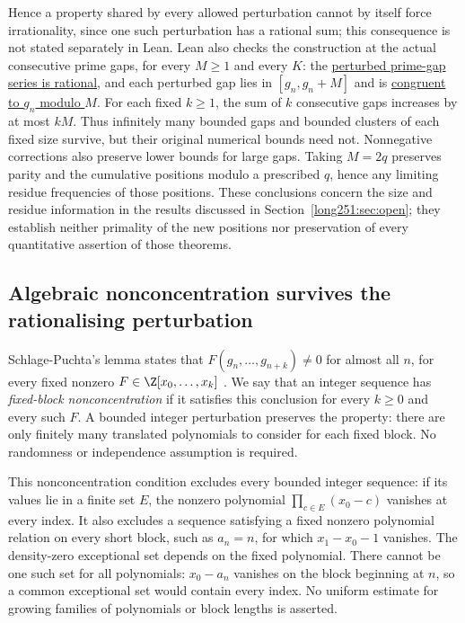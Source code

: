 \noindent Hence a property shared by every allowed perturbation cannot by
itself force irrationality, since one such perturbation has a rational sum;
this consequence is not stated separately in Lean.  Lean also checks the construction at the actual consecutive prime gaps,
for every $M\ge1$ and every $K$: the
\href{https://github.com/wcook04/plectis-erdos/blob/3d6d938d696fed0fb71dd55115a18a73738ff223/lean/ErdosProblems/Erdos251/BoundedPerturbationCountermodel.lean\#L208}{perturbed
prime-gap series is rational}, and each perturbed gap lies in
$[g_n,g_n+M]$ and is
\href{https://github.com/wcook04/plectis-erdos/blob/3d6d938d696fed0fb71dd55115a18a73738ff223/lean/ErdosProblems/Erdos251/BoundedPerturbationCountermodel.lean\#L234}{congruent
to $g_n$ modulo $M$}.  For each fixed $k\ge1$, the sum of $k$ consecutive gaps
increases by at most $kM$.  Thus infinitely many bounded gaps and bounded
clusters of each fixed size survive, but their original numerical bounds
need not.  Nonnegative corrections also preserve lower bounds for large
gaps.  Taking $M=2q$ preserves parity
and the cumulative positions modulo a prescribed $q$, hence any limiting
residue frequencies of those positions.  These conclusions concern the
size and residue information in the results discussed in
Section~\ref{long251:sec:open}; they establish neither primality of the
new positions nor preservation of every quantitative assertion of those
theorems.

\subsection{Algebraic nonconcentration survives the rationalising perturbation}

Schlage-Puchta's lemma states that
$F(g_n,\ldots,g_{n+k})\ne0$ for almost all $n$, for every fixed nonzero
$F\in\Z[x_0,\ldots,x_k]$ \cite[Lemma~4, pp.~5--6]{schlagepuchta2011}.
We say that an integer sequence has \emph{fixed-block nonconcentration}
if it satisfies this conclusion for every $k\ge0$ and every such $F$.
A bounded integer perturbation preserves the property: there are only
finitely many translated polynomials to consider for each fixed block.
No randomness or independence assumption is required.


This nonconcentration condition excludes every bounded integer sequence:
if its values lie in a finite set $E$, the nonzero polynomial
$\prod_{c\in E}(x_0-c)$ vanishes at every index.  It also excludes a
sequence satisfying a fixed nonzero polynomial relation on every short
block, such as $a_n=n$, for which $x_1-x_0-1$ vanishes.  The density-zero exceptional set depends on the fixed polynomial.
There cannot be one such set for all polynomials: $x_0-a_n$ vanishes on
the block beginning at $n$, so a common exceptional set would contain
every index.  No uniform estimate for growing families of polynomials or
block lengths is asserted.

